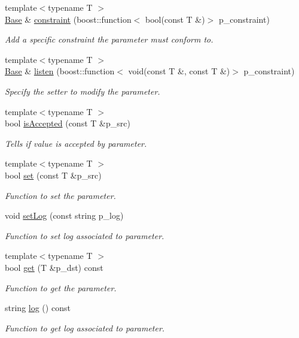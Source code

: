 \begin{DoxyCompactItemize}
{\footnotesize template$<$typename T $>$ }\\\hyperlink{classxtd_1_1servers_1_1param_1_1Base}{Base} \& \hyperlink{classxtd_1_1servers_1_1param_1_1Base_afa9ec13039176f5e8da4c1ac6dfd4063}{constraint} (boost\+::function$<$ bool(const T \&)$>$ p\+\_\+constraint)
\begin{DoxyCompactList}\small\item\em Add a specific constraint the parameter must conform to. \end{DoxyCompactList}\item 
{\footnotesize template$<$typename T $>$ }\\\hyperlink{classxtd_1_1servers_1_1param_1_1Base}{Base} \& \hyperlink{classxtd_1_1servers_1_1param_1_1Base_af34d052ef13b435479838c0372f1edb2}{listen} (boost\+::function$<$ void(const T \&, const T \&)$>$ p\+\_\+constraint)
\begin{DoxyCompactList}\small\item\em Specify the setter to modify the parameter. \end{DoxyCompactList}\item 
{\footnotesize template$<$typename T $>$ }\\bool \hyperlink{classxtd_1_1servers_1_1param_1_1Base_a6161111b66cf64a5b953bd978b498fe8}{is\+Accepted} (const T \&p\+\_\+src)
\begin{DoxyCompactList}\small\item\em Tells if value is accepted by parameter. \end{DoxyCompactList}\item 
{\footnotesize template$<$typename T $>$ }\\bool \hyperlink{classxtd_1_1servers_1_1param_1_1Base_abff2c36296d9d309baafe94e7fd65834}{set} (const T \&p\+\_\+src)
\begin{DoxyCompactList}\small\item\em Function to set the parameter. \end{DoxyCompactList}\item 
void \hyperlink{classxtd_1_1servers_1_1param_1_1Base_a47d5b5e494732932d25fa992e0a06190}{set\+Log} (const string p\+\_\+log)
\begin{DoxyCompactList}\small\item\em Function to set log associated to parameter. \end{DoxyCompactList}\item 
{\footnotesize template$<$typename T $>$ }\\bool \hyperlink{classxtd_1_1servers_1_1param_1_1Base_a48c6b4f36d84c640cc68b347090a6ec5}{get} (T \&p\+\_\+dst) const 
\begin{DoxyCompactList}\small\item\em Function to get the parameter. \end{DoxyCompactList}\item 
string \hyperlink{classxtd_1_1servers_1_1param_1_1Base_a48e7dac1fe3c43d62057e7a92e4bece9}{log} () const 
\begin{DoxyCompactList}\small\item\em Function to get log associated to parameter. \end{DoxyCompactList}\end{DoxyCompactItemize}
